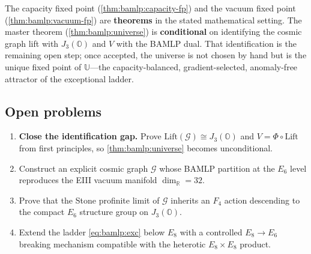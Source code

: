 \begin{remark}\label{rem:bamlp:proved-vs-conj}
The capacity fixed point (\autoref{thm:bamlp:capacity-fp}) and the vacuum fixed
point (\autoref{thm:bamlp:vacuum-fp}) are \textbf{theorems} in the stated
mathematical setting. The master theorem (\autoref{thm:bamlp:universe}) is
\textbf{conditional} on identifying the cosmic graph lift with $J_3(\mathbb{O})$
and $V$ with the BAMLP dual. That identification is the remaining open step;
once accepted, the universe is not chosen by hand but is the unique fixed point
of $\mathbb{U}$---the capacity-balanced, gradient-selected, anomaly-free
attractor of the exceptional ladder.
\end{remark}

\subsection{Open problems}
\label{sec:bamlp:open}

\begin{enumerate}
  \item \textbf{Close the identification gap.} Prove
    $\mathrm{Lift}(\mathcal{G})\cong J_3(\mathbb{O})$ and $V=\Phi\circ\mathrm{Lift}$
    from first principles, so \autoref{thm:bamlp:universe} becomes unconditional.
  \item Construct an explicit cosmic graph $\mathcal{G}$ whose BAMLP partition
    at the $E_6$ level reproduces the EIII vacuum manifold
    $\dim_{\mathbb{R}}=32$.
  \item Prove that the Stone profinite limit of $\mathcal{G}$ inherits an
    $F_4$ action descending to the compact $E_6$ structure group on
    $J_3(\mathbb{O})$.
  \item Extend the ladder \eqref{eq:bamlp:exc} below $E_8$ with a controlled
    $E_8\to E_6$ breaking mechanism compatible with the heterotic
    $E_8\times E_8$ product.
\end{enumerate}